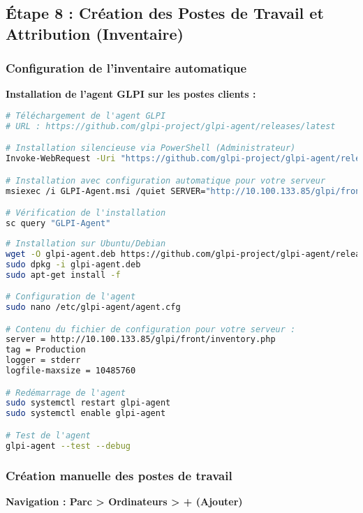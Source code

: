 \documentclass[12pt,a4paper]{article}
\begin{document}
\subsection{Étape 8 : Création des Postes de Travail et Attribution (Inventaire)}

\subsubsection{Configuration de l'inventaire automatique}
\textbf{Installation de l'agent GLPI sur les postes clients :}

\begin{lstlisting}[language=bash, caption=Installation agent GLPI - Windows]
# Téléchargement de l'agent GLPI
# URL : https://github.com/glpi-project/glpi-agent/releases/latest

# Installation silencieuse via PowerShell (Administrateur)
Invoke-WebRequest -Uri "https://github.com/glpi-project/glpi-agent/releases/download/1.7.3/GLPI-Agent-1.7.3-x64.msi" -OutFile "GLPI-Agent.msi"

# Installation avec configuration automatique pour votre serveur
msiexec /i GLPI-Agent.msi /quiet SERVER="http://10.100.133.85/glpi/front/inventory.php" TAG="Production"

# Vérification de l'installation
sc query "GLPI-Agent"
\end{lstlisting}

\begin{lstlisting}[language=bash, caption=Installation agent GLPI - Linux]
# Installation sur Ubuntu/Debian
wget -O glpi-agent.deb https://github.com/glpi-project/glpi-agent/releases/download/1.7.3/glpi-agent_1.7.3-1_amd64.deb
sudo dpkg -i glpi-agent.deb
sudo apt-get install -f

# Configuration de l'agent
sudo nano /etc/glpi-agent/agent.cfg

# Contenu du fichier de configuration pour votre serveur :
server = http://10.100.133.85/glpi/front/inventory.php
tag = Production
logger = stderr
logfile-maxsize = 10485760

# Redémarrage de l'agent
sudo systemctl restart glpi-agent
sudo systemctl enable glpi-agent

# Test de l'agent
glpi-agent --test --debug
\end{lstlisting}

\subsubsection{Création manuelle des postes de travail}
\textbf{Navigation : Parc > Ordinateurs > + (Ajouter)}
\end{document}
